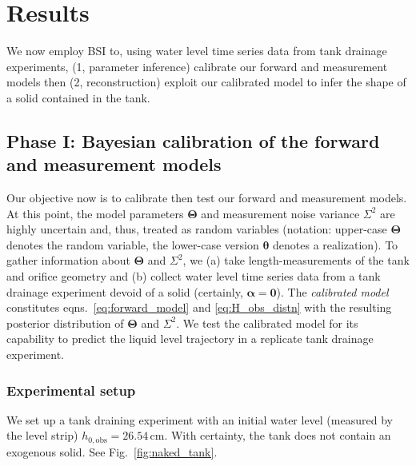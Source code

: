 \documentclass[a4paper,fleqn]{cas-dc}
\begin{document}
\section{Results}
We now employ BSI to, using water level time series data from tank drainage experiments,  
(1, parameter inference) calibrate our forward and measurement models then
(2, reconstruction) exploit our calibrated model to infer the shape of a solid contained in the tank.

\subsection{Phase I: Bayesian calibration of the forward and measurement models}
\label{sec:phaseI}
Our objective now is to calibrate then test our forward and measurement models.
At this point, the model parameters $\boldsymbol \Theta$ and measurement noise variance $\Sigma^2$ are highly uncertain and, thus, treated as random variables (notation: upper-case $\boldsymbol \Theta$ denotes the random variable, the lower-case version $\boldsymbol \theta$ denotes a realization).
To gather information about $\boldsymbol \Theta$ and $\Sigma^2$, we (a) take length-measurements of the tank and orifice geometry and (b) collect water level time series data from a tank drainage experiment devoid of a solid (certainly, $\boldsymbol \alpha = \mathbf{0}$).
The \emph{calibrated model} constitutes eqns.~\ref{eq:forward_model} and \ref{eq:H_obs_distn} with the resulting posterior distribution of $\boldsymbol \Theta$ and $\Sigma^2$. We test the calibrated model for its capability to predict the liquid level trajectory in a replicate tank drainage experiment.


\subsubsection{Experimental setup}
We set up a tank draining experiment with an initial water level (measured by the level strip) $h_{0, \text{obs}}=26.54$\,cm. 
With certainty, the tank does not contain an exogenous solid. See Fig.~\ref{fig:naked_tank}.
\end{document}
